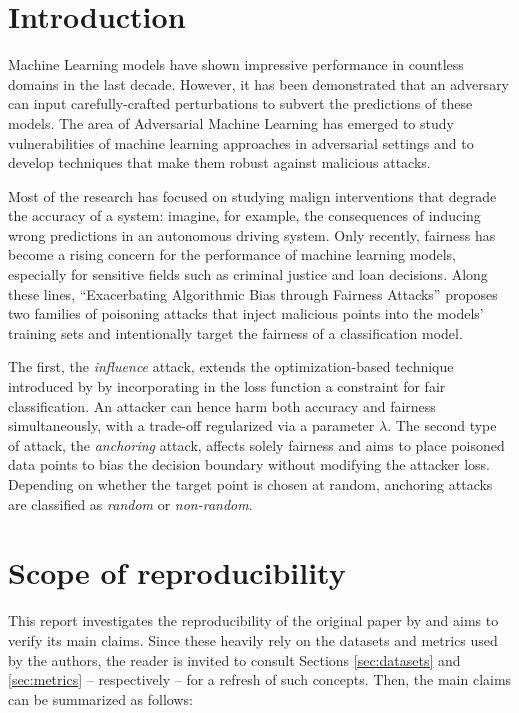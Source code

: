 

\section{Introduction}
Machine Learning models have shown impressive performance in countless domains in the last decade. However, it has been demonstrated that an adversary can input carefully-crafted perturbations to subvert the predictions of these models. The area of Adversarial Machine Learning has emerged to study vulnerabilities of machine learning approaches in adversarial settings and to develop techniques that make them robust against malicious attacks.

Most of the research has focused on studying malign interventions that degrade the accuracy of a system: imagine, for example, the consequences of inducing wrong predictions in an autonomous driving system. Only recently, fairness has become a rising concern for the performance of machine learning models, especially for sensitive fields such as criminal justice and loan decisions. Along these lines, “Exacerbating Algorithmic Bias through Fairness Attacks” \citep{originalpaper} proposes two families of poisoning attacks that inject malicious points into the models’ training sets and intentionally target the fairness of a classification model.

The first, the \textit{influence} attack, extends the optimization-based technique introduced by  by incorporating in the loss function a constraint for fair classification. An attacker can hence harm both accuracy and fairness simultaneously, with a trade-off regularized via a parameter $\lambda$. The second type of attack, the \textit{anchoring} attack, affects solely fairness and aims to place poisoned data points to bias the decision boundary without modifying the attacker loss. Depending on whether the target point is chosen at random, anchoring attacks are classified as \textit{random} or \textit{non-random}.
\section{Scope of reproducibility}
\label{sec:claims}

This report investigates the reproducibility of the original paper by  and aims to verify its main claims. Since these heavily rely on the datasets and metrics used by the authors, the reader is invited to consult Sections \ref{sec:datasets} and \ref{sec:metrics} -- respectively -- for a refresh of such concepts. Then, the main claims can be summarized as follows:

